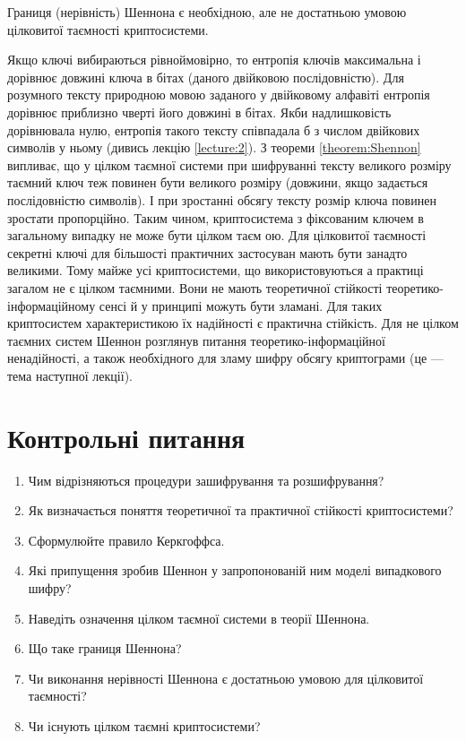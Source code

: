 \begin{remark}
    Границя (нерівність) Шеннона є необхідною, але не достатньою умовою
    цілковитої таємності криптосистеми.
\end{remark}

Якщо ключі вибираються рівноймовірно, то ентропія ключів максимальна і дорівнює
довжині ключа в бітах (даного двійковою послідовністю). Для розумного тексту
природною мовою заданого у двійковому алфавіті ентропія дорівнює приблизно
чверті його довжині в бітах. Якби надлишковість дорівнювала нулю, ентропія
такого тексту співпадала б з числом двійкових символів у ньому (дивись лекцію
\ref{lecture:2}). З теореми \ref{theorem:Shennon} випливає, що у цілком таємної
системи при шифруванні тексту великого розміру таємний ключ теж повинен бути
великого розміру (довжини, якщо задається послідовністю символів). І при
зростанні обсягу тексту розмір ключа повинен зростати пропорційно. Таким чином,
криптосистема з фіксованим ключем в загальному випадку не може бути цілком таєм
ою. Для цілковитої таємності секретні ключі для більшості практичних застосуван
мають бути занадто великими. Тому майже усі криптосистеми, що використовуються 
а практиці загалом не є цілком таємними. Вони не мають теоретичної стійкості 
теоретико-інформаційному сенсі й  у принципі можуть бути зламані. Для таких
криптосистем характеристикою їх надійності є практична стійкість. Для не цілком
таємних систем Шеннон розглянув питання теоретико-інформаційної ненадійності, а
також необхідного для зламу шифру обсягу криптограми (це --- тема наступної
лекції).

\section{Контрольні питання}

\begin{enumerate}
    \item Чим відрізняються процедури зашифрування та розшифрування?
    \item Як визначається поняття теоретичної та практичної стійкості
        криптосистеми?
    \item Сформулюйте правило Керкгоффса.
    \item Які припущення зробив Шеннон у запропонованій ним моделі випадкового
        шифру?
    \item Наведіть означення цілком таємної системи в теорії Шеннона.
    \item Що таке границя Шеннона?
    \item Чи виконання нерівності Шеннона є достатньою умовою для цілковитої
        таємності?
    \item Чи існують цілком таємні криптосистеми? 
\end{enumerate}

